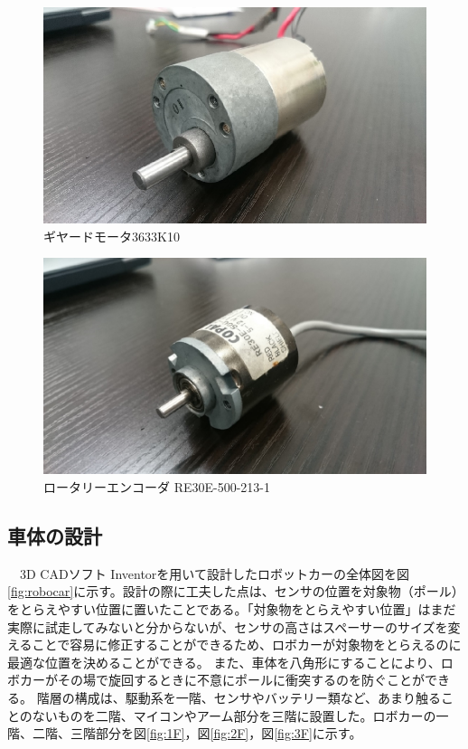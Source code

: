 \documentclass[11pt,a4paper]{jsarticle}
\begin{document}
\begin{figure}[H]
 \begin{center}
  \includegraphics[scale=.7]{./picture/picture2.eps}
  \caption{ギヤードモータ3633K10}
 \end{center}
\end{figure}

\begin{figure}[H]
 \begin{center}
  \includegraphics[scale=.7]{./picture/picture3.eps}
  \caption{ロータリーエンコーダ RE30E-500-213-1}
 \end{center}
\end{figure}



\subsection{車体の設計}
　3D CADソフト Inventorを用いて設計したロボットカーの全体図を図\ref{fig:robocar}に示す。設計の際に工夫した点は、センサの位置を対象物（ポール）をとらえやすい位置に置いたことである。「対象物をとらえやすい位置」はまだ実際に試走してみないと分からないが、センサの高さはスペーサーのサイズを変えることで容易に修正することができるため、ロボカーが対象物をとらえるのに最適な位置を決めることができる。
また、車体を八角形にすることにより、ロボカーがその場で旋回するときに不意にポールに衝突するのを防ぐことができる。
階層の構成は、駆動系を一階、センサやバッテリー類など、あまり触ることのないものを二階、マイコンやアーム部分を三階に設置した。ロボカーの一階、二階、三階部分を図\ref{fig:1F}，図\ref{fig:2F}，図\ref{fig:3F}に示す。
\end{document}
